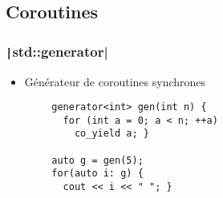 \documentclass[C++.tex]{subfiles}
\begin{document}
\subsection*{Coroutines}
\begin{frame}[fragile]
	\frametitle{\texttt|std::generator|}
	\begin{itemize}
		\item Générateur de coroutines synchrones
	\end{itemize}

	\begin{verbatim}
		generator<int> gen(int n) {
		  for (int a = 0; a < n; ++a)
		    co_yield a; }

		auto g = gen(5);
		for(auto i: g) {
		  cout << i << " "; }
	\end{verbatim}


\end{frame}
\end{document}
